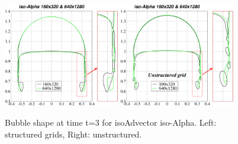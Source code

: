 \documentclass[review]{elsarticle}
\begin{document}
\begin{figure}[!h]
\begin{center}
 \includegraphics[width=0.45\textwidth]{figures/bubble_shape_t=3_isoAlpha-struct.pdf}
 \hspace{2mm}
 \includegraphics[width=0.45\textwidth]{figures/bubble_shape_t=3_isoAlpha-uns.pdf}
 \vspace{-6mm}
\end{center}
\caption{Bubble shape at time t=3 for isoAdvector iso-Alpha. Left: structured grids, Right: unstructured.}
\label{fig:HB_bubble_shape_3_isoAlpha}
\end{figure}
\end{document}
